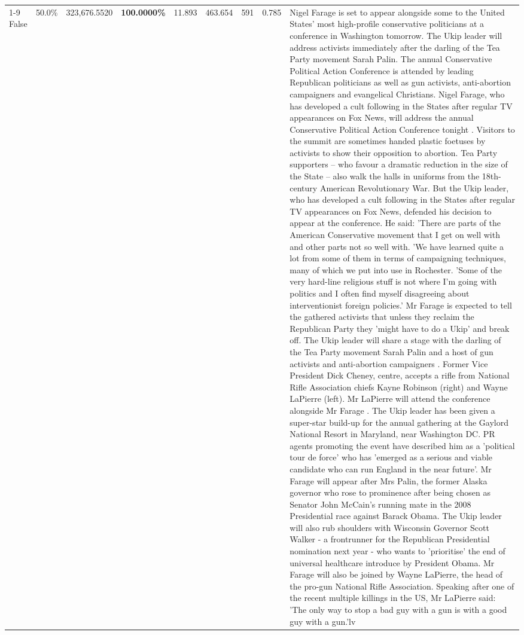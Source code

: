 \begin{table}[H]
\begin{tabular}{lllrlllll}
\cline{1-9}
False & 50.0\% & 323,676.5520 & \bfseries \color{red} 100.0000\% & 11.893 & 463.654 & 591 & 0.785 & Nigel Farage is set to appear alongside some to the United States' most high-profile conservative politicians at a conference in Washington tomorrow. The Ukip leader will address activists immediately after the darling of the Tea Party movement Sarah Palin. The annual Conservative Political Action Conference is attended by leading Republican politicians as well as gun activists, anti-abortion campaigners and evangelical Christians. Nigel Farage, who has developed a cult following in the States after regular TV appearances on Fox News, will address the annual Conservative Political Action Conference tonight . Visitors to the summit are sometimes handed plastic foetuses by activists to show their opposition to abortion. Tea Party supporters – who favour a dramatic reduction in the size of the State – also walk the halls in uniforms from the 18th-century American Revolutionary War. But the Ukip leader, who has developed a cult following in the States after regular TV appearances on Fox News, defended his decision to appear at the conference. He said: 'There are parts of the American Conservative movement that I get on well with and other parts not so well with. 'We have learned quite a lot from some of them in terms of campaigning techniques, many of which we put into use in Rochester. 'Some of the very hard-line religious stuff is not where I'm going with politics and I often find myself disagreeing about interventionist foreign policies.' Mr Farage is expected to tell the gathered activists that unless they reclaim the Republican Party they 'might have to do a Ukip' and break off. The Ukip leader will share a stage with the darling of the Tea Party movement Sarah Palin and a host of gun activists and anti-abortion campaigners . Former Vice President Dick Cheney, centre, accepts a rifle from National Rifle Association chiefs Kayne Robinson (right) and Wayne LaPierre (left). Mr LaPierre will attend the conference alongside Mr Farage . The Ukip leader has been given a super-star build-up for the annual gathering at the Gaylord National Resort in Maryland, near Washington DC. PR agents promoting the event have described him as a 'political tour de force' who has 'emerged as a serious and viable candidate who can run England in the near future'. Mr Farage will appear after Mrs Palin, the former Alaska governor who rose to prominence after being chosen as Senator John McCain's running mate in the 2008 Presidential race against Barack Obama. The Ukip leader will also rub shoulders with Wisconsin Governor Scott Walker - a frontrunner for the Republican Presidential nomination next year - who wants to 'prioritise' the end of universal healthcare introduce by President Obama. Mr Farage will also be joined by Wayne LaPierre, the head of the pro-gun National Rifle Association. Speaking after one of the recent multiple killings in the US, Mr LaPierre said: 'The only way to stop a bad guy with a gun is with a good guy with a gun.'lv \\

\end{tabular}
\end{table}

